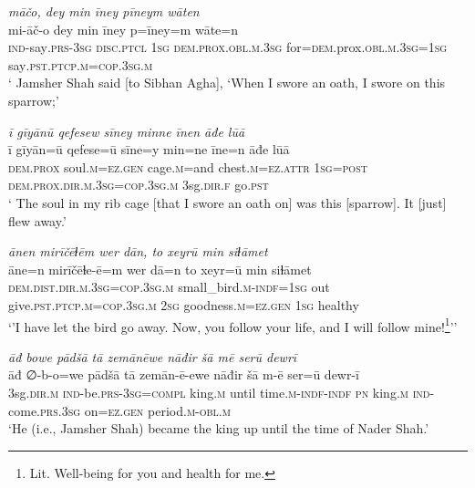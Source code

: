 \ea \label{DP.48}
\textit{māčo, dey min īney pīneym wāten} \\ 
\gll mi-āč-o dey min īney p=īney=m wāte=n \\ 
 \textsc{ind-}say\textsc{.prs}\textsc{-3sg} \textsc{disc.ptcl} \textsc{1sg} \textsc{dem.prox}\textsc{.obl}\textsc{.m}\textsc{.3sg} for\textsc{=dem}.prox\textsc{.obl}\textsc{.m}\textsc{.3sg}\textsc{=1sg} say\textsc{.pst}\textsc{.ptcp}\textsc{.m}\textsc{=cop}\textsc{.3sg}\textsc{.m} \\ 
\glt ` Jamsher Shah said [to Sibhan Agha], ‘When I swore an oath, I swore on this sparrow;'
\z 
 
\ea \label{DP.49}
\textit{ī gīyānū qefesew sīney minne īnen āđe lūā} \\ 
\gll ī gīyān=ū qefese=ū sīne=y min=ne īne=n āđe lūā \\ 
 \textsc{dem.prox} soul\textsc{.m}\textsc{=ez}\textsc{.gen} cage\textsc{.m}=and chest\textsc{.m}\textsc{=ez}.\textsc{attr} \textsc{1sg}\textsc{=\textsc{post}} \textsc{dem.prox}\textsc{.dir}\textsc{.m}\textsc{.3sg}\textsc{=cop}\textsc{.3sg}\textsc{.m} 3sg\textsc{.dir}\textsc{\textsc{.f}} go\textsc{.pst} \\ 
\glt ` The soul in my rib cage [that I swore an oath on] was this [sparrow]. It [just] flew away.'
\z 
 
\ea \label{DP.50}
\textit{ānen mirīčēɫēm wer dān, to xeyrū min siɫāmet} \\ 
\gll āne=n mirīčēɫe-ē=m wer dā=n to xeyr=ū min siɫāmet \\ 
 \textsc{dem.dist}\textsc{.dir}\textsc{.m}\textsc{.3sg}\textsc{=cop}\textsc{.3sg}\textsc{.m} small\_bird\textsc{.m}\textsc{-indf}\textsc{=1sg} out give\textsc{.pst}\textsc{.ptcp}\textsc{.m}\textsc{=cop}\textsc{.3sg}\textsc{.m} \textsc{2sg} goodness\textsc{.m}\textsc{=ez}\textsc{.gen} \textsc{1sg} healthy \\ 
\glt `’I have let the bird go away. Now, you follow your life, and I will follow mine!\footnote{Lit. Well-being for you and health for me.}’'
\z 
 
\ea \label{DP.53}
\textit{āđ bowe pādšā tā zemānēwe nāđir šā mē serū dewrī} \\ 
\gll āđ ∅-b-o=we pādšā tā zemān-ē-ewe nāđir šā m-ē ser=ū dewr-ī \\ 
 3sg\textsc{.dir}\textsc{.m} \textsc{ind-}be\textsc{.prs}\textsc{-3sg}\textsc{=\textsc{compl}} king\textsc{.m} until time\textsc{.m}\textsc{-indf}\textsc{-indf} \textsc{pn} king\textsc{.m} \textsc{ind-}come\textsc{.prs}\textsc{.3sg} on\textsc{=ez}\textsc{.gen} period\textsc{.m}\textsc{-obl}\textsc{.m} \\ 
\glt `He (i.e., Jamsher Shah) became the king up until the time of Nader Shah.'
\z 
 
